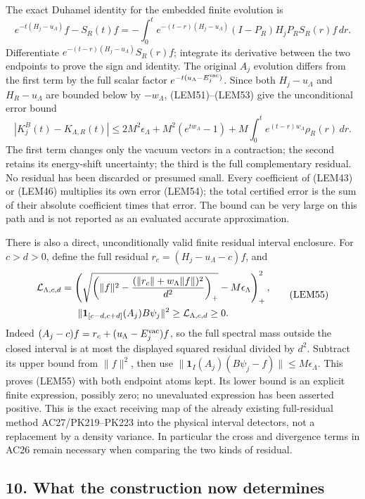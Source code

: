 \documentclass[11pt]{article}
\begin{document}
The exact Duhamel identity for the embedded finite evolution is
\[
e^{-t(H_j-u_\Lambda)}f-S_R(t)f
=-\int_0^t e^{-(t-r)(H_j-u_\Lambda)}
          (I-P_R)H_jP_RS_R(r)f\,dr.
\tag{LEM53}
\]
Differentiate \(e^{-(t-r)(H_j-u_\Lambda)}S_R(r)f\); integrate its derivative between the two endpoints to prove the sign and identity. The original \(A_j\) evolution differs from the first term by the full scalar factor \(e^{-t(u_\Lambda-E_j^{\rm vac})}\). Since both \(H_j-u_\Lambda\) and \(H_R-u_\Lambda\) are bounded below by \(-w_\Lambda\), (LEM51)–(LEM53) give the unconditional error bound
\[
\left|K_j^B(t)-K_{\Lambda,R}(t)\right|
\le 2M^2\epsilon_\Lambda
 +M^2(e^{tw_\Lambda}-1)
 +M\int_0^t e^{(t-r)w_\Lambda}\rho_R(r)\,dr.
\tag{LEM54}
\]
The first term changes only the vacuum vectors in a contraction; the second retains its energy-shift uncertainty; the third is the full complementary residual. No residual has been discarded or presumed small. Every coefficient of (LEM43) or (LEM46) multiplies its own error (LEM54); the total certified error is the sum of their absolute coefficient times that error. The bound can be very large on this path and is not reported as an evaluated accurate approximation.

There is also a direct, unconditionally valid finite residual interval enclosure. For \(c>d>0\), define the full residual \(r_c=(H_j-u_\Lambda-c)f\), and
\[
\begin{gathered}
\mathcal L_{\Lambda,c,d}
=\left(\sqrt{\left(\|f\|^2-
 {(\|r_c\|+w_\Lambda\|f\|)^2\over d^2}\right)_+}
       -M\epsilon_\Lambda\right)_+^2,\\
\|\mathbf1_{[c-d,c+d]}(A_j)B\psi_j\|^2
\ge\mathcal L_{\Lambda,c,d}\ge0 .
\end{gathered}\tag{LEM55}
\]
Indeed \((A_j-c)f=r_c+(u_\Lambda-E_j^{\rm vac})f\), so the full spectral mass outside the closed interval is at most the displayed squared residual divided by \(d^2\). Subtract its upper bound from \(\|f\|^2\), then use
\(\|\mathbf1_I(A_j)(B\psi_j-f)\|\le M\epsilon_\Lambda\).
This proves (LEM55) with both endpoint atoms kept. Its lower bound is an explicit finite expression, possibly zero; no unevaluated expression has been asserted positive. This is the exact receiving map of the already existing full-residual method AC27/PK219–PK223 into the physical interval detectors, not a replacement by a density variance. In particular the cross and divergence terms in AC26 remain necessary when comparing the two kinds of residual.

\subsection*{10. What the construction now determines}
\end{document}
